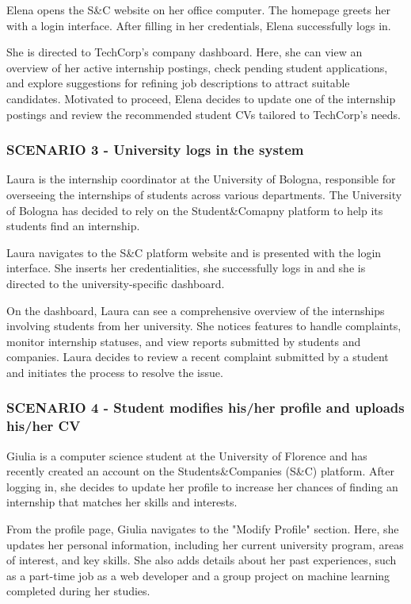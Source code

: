 Elena opens the S\&C website on her office computer. The homepage greets her with a login interface.
After filling in her
credentials, Elena successfully logs in.  

She is directed to TechCorp’s company dashboard. Here, she can view an overview of her active
internship postings, check pending student applications, and explore suggestions for refining
job descriptions to attract suitable candidates. Motivated to proceed, Elena decides to update one
of the internship postings and review the recommended student CVs tailored to TechCorp’s needs.  
\subsubsection{SCENARIO 3 - University logs in the system}
Laura is the internship coordinator at the University of Bologna, responsible for overseeing the
internships of students across various departments. The University of Bologna has decided
to rely on the Student\&Comapny platform to help its students find an internship.

Laura navigates to the S\&C platform website and is presented with the login interface.
She inserts her credentialities, she successfully logs in and she is
directed to the university-specific dashboard.  

On the dashboard, Laura can see a comprehensive overview of the internships involving students
from her university. She notices features to handle complaints, monitor internship statuses, and
view reports submitted by students and companies. Laura decides to review a recent complaint submitted
by a student and initiates the process to resolve the issue.
\subsubsection{SCENARIO 4 - Student modifies his/her profile and uploads his/her CV}
Giulia is a computer science student at the University of Florence and has recently
created an account on the Students\&Companies (S\&C) platform. After logging in, she decides to update her
profile to increase her chances of finding an internship that matches her skills and interests.  

From the profile page, Giulia navigates to the "Modify Profile" section. Here, she updates
her personal information, including her current university program, areas of interest, and key
skills. She also adds details about her past experiences, such as a part-time job as a web developer
and a group project on machine learning completed during her studies.  

